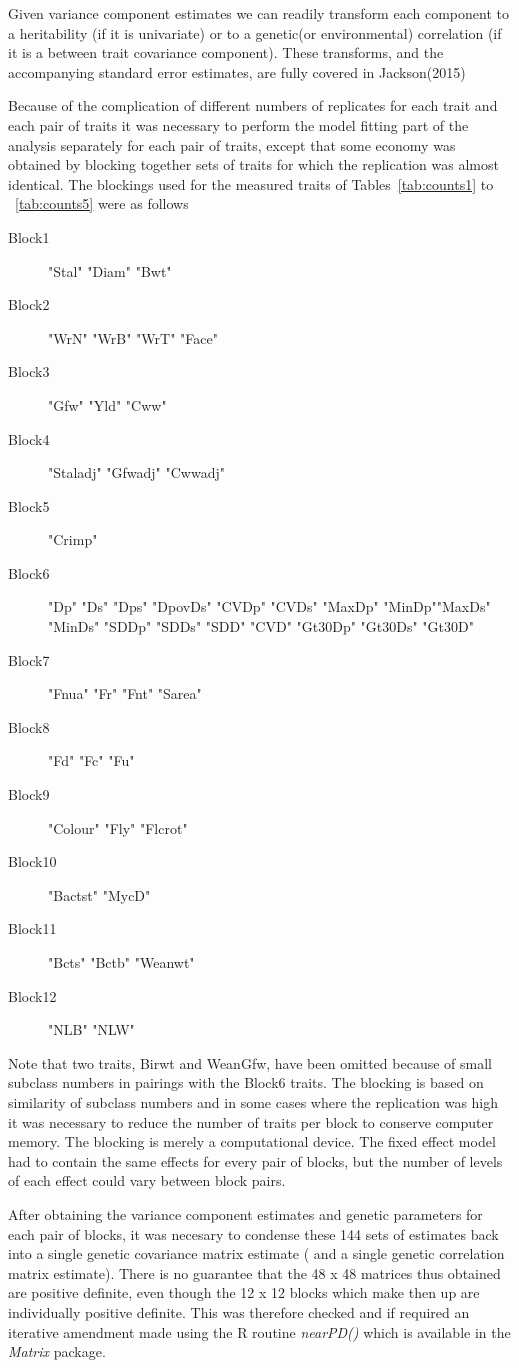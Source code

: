 \documentclass[titlepage]{article}  %
\begin{document}
Given variance component estimates we can readily transform each component to a heritability (if it is univariate) or to a genetic(or environmental) correlation (if it is a between trait covariance component). These transforms, and the accompanying standard error estimates, are fully covered in Jackson(2015)~\cite{jack:15b}

Because of the complication of different numbers of replicates for each trait and each pair of traits it was necessary to perform the model fitting part of the analysis separately for each pair of traits, except that some economy was obtained by blocking together sets of traits for which the replication was almost identical. The blockings used for the measured traits of Tables~\ref{tab:counts1} to ~\ref{tab:counts5} were as follows
\begin{description}
\item[Block1] "Stal" "Diam" "Bwt"
\item[Block2] "WrN"  "WrB"  "WrT"  "Face"
\item[Block3] "Gfw" "Yld" "Cww"
\item[Block4] "Staladj" "Gfwadj"  "Cwwadj"
\item[Block5] "Crimp"
\item[Block6] "Dp"     "Ds"     "Dps"    "DpovDs" "CVDp"   "CVDs"   "MaxDp"  "MinDp""MaxDs"  "MinDs"  "SDDp"   "SDDs"   "SDD"    "CVD"    "Gt30Dp" "Gt30Ds" "Gt30D"
\item[Block7] "Fnua"  "Fr"    "Fnt"   "Sarea"
\item[Block8] "Fd" "Fc" "Fu"
\item[Block9] "Colour" "Fly"    "Flcrot"
\item[Block10] "Bactst" "MycD"
\item[Block11] "Bcts"   "Bctb"   "Weanwt"
\item[Block12] "NLB" "NLW" 
\end{description} 
Note that two traits, Birwt and WeanGfw, have been omitted because of small subclass numbers in pairings with the Block6 traits. The blocking is based on similarity of subclass numbers and in some cases where the replication was high it was necessary to reduce the number of traits per block to conserve computer memory. The blocking is merely a computational device. The fixed effect model had to contain the same effects for every pair of blocks, but the number of levels of each effect could vary between block pairs.

After obtaining the variance component estimates and genetic parameters for each pair of blocks, it was necesary to condense these 144 sets of estimates back into a single genetic covariance matrix estimate ( and a single genetic correlation matrix estimate). There is no guarantee that the 48 x 48 matrices thus obtained are positive definite, even though the 12 x 12 blocks which make then up are individually positive definite. This was therefore checked and if required an iterative amendment made using the R routine {\em nearPD()} which is available in the {\em Matrix} package.
\end{document}

